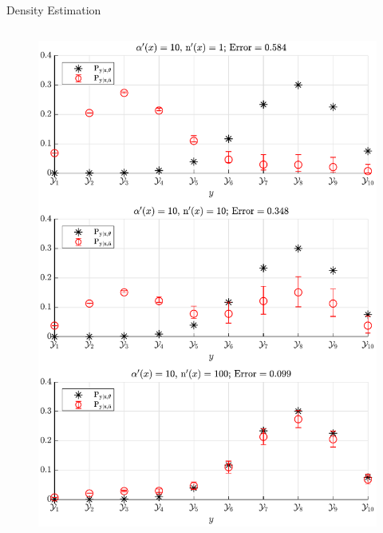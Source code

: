 \documentclass[final]{beamer}
\begin{document}
\begin{frame}{}
\begin{columns}[T]
\begin{column}{.34\linewidth}
\begin{block}{Density Estimation}
\begin{columns}[t]
\begin{column}{.5\linewidth}
\begin{figure}
\centering
\includegraphics[width=0.9\linewidth]{P_yx_error_a0_10.pdf}
\end{figure}

\end{column}
\end{columns}



\end{block}  
    
\end{column}




\end{columns}


\end{frame}
\end{document}
